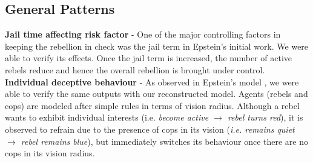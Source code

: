\documentclass[a4paper,11pt]{article}
\begin{document}
\subsection{General Patterns}
\textbf{Jail time affecting risk factor} - One of the major controlling factors in keeping the rebellion in check was the jail term in Epstein's initial work. We were able to verify its effects. Once the jail term is increased, the number of active rebels reduce and hence the overall rebellion is brought under control.
\\
\textbf{Individual deceptive behaviour} - 
As observed in Epstein’s model \cite{epstein2002modeling}, we were able to verify the same outputs with our reconstructed model. Agents (rebels and cops) are modeled after simple rules in terms of vision radius. Although a rebel wants to exhibit individual interests (i.e. \textit{become active $\rightarrow$ rebel turns red}), it is observed to refrain due to the presence of cops in its vision (\textit{i.e. remains quiet $\rightarrow$ rebel remains blue}), but immediately switches its behaviour once there are no cops in its vision radius. %
\\
\end{document}
